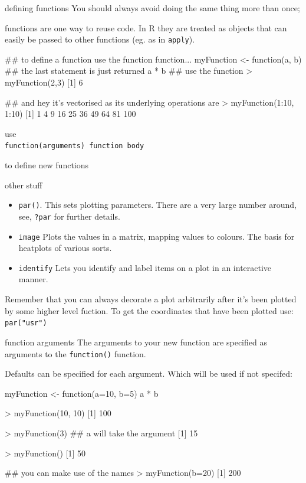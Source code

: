 \documentclass[pdf]{beamer}
\begin{document}
\begin{frame}[fragile]{defining functions}
  You should always avoid doing the same thing more than once;

  functions are one way to reuse code. In R they are treated
  as objects that can easily be passed to other functions
  (eg. as in \texttt{apply}).

  \begin{rcode}
    ## to define a function use the function function...
    myFunction <- function(a, b){
      ## the last statement is just returned
      a * b
    }
    ## use the function
    > myFunction(2,3)
    [1] 6

    ## and hey it's vectorised as its underlying operations are
    > myFunction(1:10, 1:10)
    [1]   1   4   9  16  25  36  49  64  81 100
  \end{rcode}

  use\\
  \hspace{4em} \texttt{function(arguments){ function body }}

  to define new functions
\end{frame}

\begin{frame}{other stuff}
  \begin{itemize}
  \item \texttt{par()}. This sets plotting parameters. There are
    a very large number around, see, \texttt{?par} for further details.
  \item \texttt{image} Plots the values in a matrix, mapping values to
    colours. The basis for heatplots of various sorts.
  \item \texttt{identify} Lets you identify and label items on a plot
    in an interactive manner.
 \end{itemize}
 
 Remember that you can always decorate a plot arbitrarily after it's
 been plotted by some higher level fuction. To get the coordinates that
 have been plotted use: \texttt{par("usr")}

\end{frame}

\begin{frame}[fragile]{function arguments}
  The arguments to your new function are specified as arguments
  to the \texttt{function()} function.

  Defaults can be specified for each argument. Which will be used
  if not specifed:

  \begin{rcode}
    myFunction <- function(a=10, b=5){
      a * b
    }
    
    > myFunction(10, 10)
    [1] 100

    > myFunction(3)  ## a will take the argument
    [1] 15

    > myFunction()
    [1] 50

    ## you can make use of the names
    > myFunction(b=20)
    [1] 200
  \end{rcode}
\end{frame}
\end{document}
